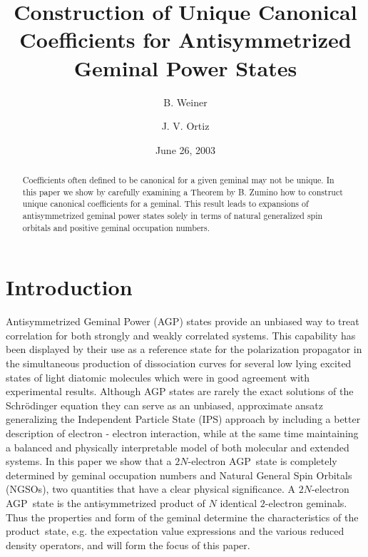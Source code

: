 \documentclass[preprint,aps,showkeys]{revtex4}%
\begin{document}
\preprint{ }
\title[Antisym. Mat]{Construction of Unique Canonical Coefficients for Antisymmetrized Geminal
Power States}
\author{B. Weiner}
\author{J. V. Ortiz}

\begin{abstract}
Coefficients often defined to be canonical for a given geminal may not be
unique. In this paper we show by carefully examining a Theorem by B. Zumino
how to construct unique canonical coefficients for a geminal. This result
leads to expansions of antisymmetrized geminal power states solely in terms of
natural generalized spin orbitals and positive geminal occupation numbers.

\end{abstract}
\date{June 26, 2003}
\maketitle




\section{Introduction\label{intro}}

Antisymmetrized Geminal Power (AGP) states provide an unbiased way to treat
correlation for both strongly and weakly correlated systems. This capability
has been displayed by their use as a reference state for the polarization
propagator \cite{weiner87,Weiner85,Weiner84a,Kurtz83,Jorgen83} in the
simultaneous production of dissociation curves for several low lying excited
states of light diatomic molecules which were in good agreement with
experimental results. Although AGP states are rarely the exact solutions of
the Schr\"{o}dinger equation they can serve as an unbiased, approximate ansatz
generalizing the Independent Particle State (IPS) approach by including a
better description of electron - electron interaction, while at the same time
maintaining a balanced and physically interpretable model of both molecular
and extended systems. In this paper we show that a $2N$-electron AGP\ state is
completely determined by geminal occupation numbers and Natural General Spin
Orbitals (NGSOs), two quantities that have a clear physical significance. A
$2N$-electron AGP\ state is the antisymmetrized product of $N$ identical
$2$-electron geminals. Thus the properties and form of the geminal determine
the characteristics of the product\ state, e.g. the expectation value
expressions and the various reduced density operators, and will form the focus
of this paper.
\end{document}
